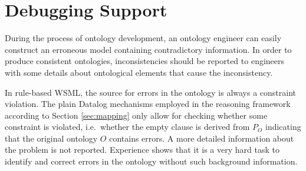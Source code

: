 \def\transdebug{\transtxt{debug}}
\def\pvotype{\predicate{\predsubtxt{v\_otype}}}
\def\pvmincard{\predicate{\predsubtxt{v\_mincard}}}
\def\pvmaxcard{\predicate{\predsubtxt{v\_maxcard}}}
\def\pvuser{\predicate{\predsubtxt{v\_user}}}
\def\axiomid{\ensuremath{Ax_{I\!D}}\xspace}
\def\debugaxioms{\ensuremath{P_{\smtxtit{debug}}}\xspace}

\section{Debugging Support\label{sec:debugging}}

During the process of ontology development, an ontology engineer
can easily construct an erroneous model containing
contradictory information. In order to produce consistent
ontologies, inconsistencies should be reported to engineers with
some details about ontological elements that cause the inconsistency.

In rule-based WSML, the source for errors in the ontology is always a constraint violation. The plain Datalog mechanisms employed in the reasoning
framework according to Section \ref{sec:mapping} only allow for
checking whether some constraint is violated, i.e.\ whether the
empty clause is derived from $P_O$ indicating that the original
ontology $O$ contains errors. A more detailed
information about the problem is not reported. Experience shows that it is a very hard task to identify and correct errors in the ontology without such background information.

